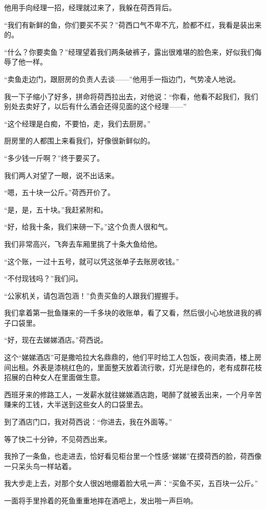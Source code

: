 \par 他用手向经理一招，经理就过来了，我躲在荷西背后。
\par “我们有新鲜的鱼，你们要买不买？”荷西口气不卑不亢，脸都不红，我看是装出来的。
\par “什么？你要卖鱼？”经理望着我们两条破裤子，露出很难堪的脸色来，好似我们侮辱了他一样。
\par “卖鱼走边门，跟厨房的负责人去谈——”他用手一指边门，气势凌人地说。
\par 我一下子缩小了好多，拼命将荷西拉出去，对他说：“你看，他看不起我们，我们别处去卖好了，以后有什么酒会还得见面的这个经理——”
\par “这个经理是白痴，不要怕，走，我们去厨房。”
\par 厨房里的人都围上来看我们，好像很新鲜似的。
\par “多少钱一斤啊？”终于要买了。
\par 我们两人对望了一眼，说不出话来。
\par “嗯，五十块一公斤。”荷西开价了。
\par “是，是，五十块。”我赶紧附和。
\par “好，给我十条，我们来磅一下。”这个负责人很和气。
\par 我们非常高兴，飞奔去车厢里挑了十条大鱼给他。
\par “这个账，一过十五号，就可以凭这张单子去账房收钱。”
\par “不付现钱吗？”我们问。
\par “公家机关，请包涵包涵！”负责买鱼的人跟我们握握手。
\par 我们拿着第一批鱼赚来的一千多块的收账单，看了又看，然后很小心地放进我的裤子口袋里。
\par “好，现在去娣娣酒店。”荷西说。
\par 这个“娣娣酒店”可是撒哈拉大名鼎鼎的，他们平时给工人包饭，夜间卖酒，楼上房间出租。外表是漆桃红色的，里面整天放着流行歌，灯光是绿色的，老有成群花枝招展的白种女人在里面做生意。
\par 西班牙来的修路工人，一发薪水就往娣娣酒店跑，喝醉了就被丢出来，一个月辛苦赚来的工钱，大半送到这些女人的口袋里去。
\par 到了酒店门口，我对荷西说：“你进去，我在外面等。”
\par 等了快二十分钟，不见荷西出来。
\par 我拎了一条鱼，也走进去，恰好看见柜台里一个性感“娣娣”在摸荷西的脸，荷西像一只呆头鸟一样站着。
\par 我大步走上去，对那个女人很凶地绷着脸大吼一声：“买鱼不买，五百块一公斤。”
\par 一面将手里拎着的死鱼重重地摔在酒吧上，发出啪一声巨响。

